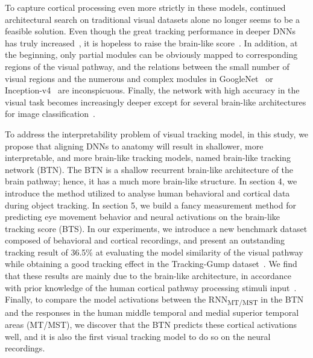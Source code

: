 \documentclass[sn-mathphys]{sn-jnl}%
\theoremstyle{thmstyleone}%
\theoremstyle{thmstyletwo}%
\theoremstyle{thmstylethree}%
\begin{document}
To capture cortical processing even more strictly in these models, continued architectural search on traditional visual datasets alone no longer seems to be a feasible solution. 
Even though the great tracking performance in deeper DNNs has truly increased~\cite{ILSVRC15,luo2021trajectory}, it is hopeless to raise the brain-like score~\cite{rajalingham2018large,su2020incremental}. 
In addition, at the beginning, only partial modules can be obviously mapped to corresponding regions of the visual pathway, 
and the relations between the small number of visual regions and the numerous and complex modules in GoogleNet~\cite{szegedy2015going} or Inception-v4~\cite{szegedy2017inception} are inconspicuous. 
Finally, the network with high accuracy in the visual task becomes increasingly deeper except for several brain-like architectures for image classification~\cite{TangSchrimpfLotter2018Recurrent, kar2019evidence}. 


To address the interpretability problem of visual tracking model, in this study, we propose that aligning DNNs to anatomy will result in shallower, more interpretable, and more brain-like tracking models, named brain-like tracking network (BTN).
The BTN is a shallow recurrent brain-like architecture of the brain pathway; 
hence, it has a much more brain-like structure. 
In section 4, we introduce the method utilized to analyse human behavioral and cortical data during object tracking. 
In section 5, we build a fancy measurement method for predicting eye movement behavior and neural activations on the brain-like tracking score (BTS). 
In our experiments, we introduce a new benchmark dataset composed of behavioral and cortical recordings, 
and present an outstanding tracking result of 36.5\% at evaluating the model similarity of the visual pathway while obtaining a good tracking effect in the Tracking-Gump dataset~\cite{gaze_forrest}. 
We find that these results are mainly due to the brain-like architecture, in accordance with prior knowledge of the human cortical pathway processing stimuli input~\cite{TangSchrimpfLotter2018Recurrent, yin2020deep, kar2019evidence}. 
Finally, to compare the model activations between the RNN\textsubscript{MT/MST} in the BTN and the responses in the human middle temporal and medial superior temporal areas (MT/MST), we discover that the BTN predicts these cortical activations well, 
and it is also the first visual tracking model to do so on the neural recordings. 

\end{document}
